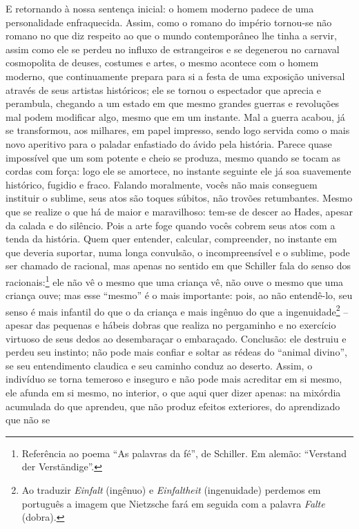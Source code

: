 E retornando à nossa sentença inicial: o homem moderno padece de uma
personalidade enfraquecida. Assim, como o romano do império tornou-se
não romano no que diz respeito ao que o mundo contemporâneo lhe tinha a
servir, assim como ele se perdeu no influxo de estrangeiros e se
degenerou no carnaval cosmopolita de deuses, costumes e artes, o mesmo
acontece com o homem moderno, que continuamente prepara para si a festa
de uma exposição universal através de seus artistas históricos; ele se
tornou o espectador que aprecia e perambula, chegando a um estado em que
mesmo grandes guerras e revoluções mal podem modificar algo, mesmo que
em um instante. Mal a guerra acabou, já se transformou, aos milhares,
em papel impresso, sendo logo servida como o mais novo aperitivo para o
paladar enfastiado do ávido pela história. Parece quase impossível que
um som potente e cheio se produza, mesmo quando se tocam as cordas com
força: logo ele se amortece, no instante seguinte ele já soa suavemente
histórico, fugidio e fraco. Falando moralmente, vocês não mais conseguem
instituir o sublime, seus atos são toques súbitos, não trovões
retumbantes. Mesmo que se realize o que há de maior e maravilhoso:
tem-se de descer ao Hades, apesar da calada e do silêncio. Pois a arte
foge quando vocês cobrem seus atos com a tenda da história. Quem quer
entender, calcular, compreender, no instante em que deveria suportar,
numa longa convulsão, o incompreensível e o sublime, pode ser chamado de
racional, mas apenas no sentido em que Schiller fala do senso dos
racionais:\footnote{Referência ao poema ``As palavras da fé'', de
  Schiller. Em alemão: ``Verstand der Verständige''.} ele não vê o
mesmo que uma criança vê, não ouve o mesmo que uma criança ouve; mas
esse ``mesmo'' é o mais importante: pois, ao não entendê-lo, seu senso é
mais infantil do que o da criança e mais ingênuo do que a
ingenuidade\footnote{Ao traduzir \emph{Einfalt} (ingênuo) e
  \emph{Einfaltheit} (ingenuidade) perdemos em português a imagem que
  Nietz\-sche fará em seguida com a palavra \emph{Falte} (dobra).} --
apesar das pequenas e hábeis dobras que realiza no pergaminho e no
exercício virtuoso de seus dedos ao desembaraçar o embaraçado.
Conclusão: ele destruiu e perdeu seu instinto; não pode mais confiar e
soltar as rédeas do ``animal divino'', se seu entendimento claudica e
seu caminho conduz ao deserto. Assim, o indivíduo se torna temeroso e
inseguro e não pode mais acreditar em si mesmo, ele afunda em si mesmo,
no interior, o que aqui quer dizer apenas: na mixórdia acumulada do que
aprendeu, que não produz efeitos exteriores, do aprendizado que não se
